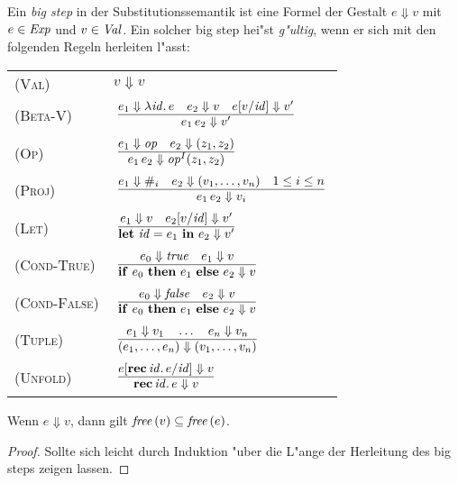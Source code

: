\documentclass[12pt,fleqn,a4paper]{article}
\newcommand{\RN}[1]{\mbox{\textsc{(#1)}}}
\begin{document}
\begin{definition}
Ein {\em big step} in der Substitutionssemantik ist eine Formel der Gestalt $e \Downarrow v$ mit $e\in{\text{\it Exp\/}}$
und $v \in {\text{\it Val\/}}$. Ein solcher big step hei"st {\em g"ultig}, wenn er sich mit den folgenden Regeln herleiten
l"asst: \\[5mm]
\begin{tabular}{ll}
  \RN{Val}        & $v \Downarrow v$ \\[3mm]
  \RN{Beta-V}     & $\regel{e_1 \Downarrow \abstr{\id}{e} \quad e_2 \Downarrow v \quad e[v/\id] \Downarrow v'}
                           {\app{e_1}{e_2} \Downarrow v'}$ \\[3mm]
  \RN{Op}         & $\regel{e_1 \Downarrow \op \quad e_2 \Downarrow (z_1,z_2)}
                           {\app{e_1}{e_2} \Downarrow \op^I(z_1,z_2)}$ \\[3mm]
  \RN{Proj}       & $\regel{e_1 \Downarrow \proj{i} \quad e_2 \Downarrow (v_1,\ldots,v_n) \quad 1 \le i \le n}
                           {\app{e_1}{e_2} \Downarrow v_i}$ \\[3mm]
  \RN{Let}        & $\regel{e_1 \Downarrow v \quad e_2[v/\id] \Downarrow v'}
                           {\bli{\id}{e_1}{e_2} \Downarrow v'}$ \\[3mm]
  \RN{Cond-True}  & $\regel{e_0 \Downarrow \true \quad e_1 \Downarrow v}
                           {\bifte{e_0}{e_1}{e_2} \Downarrow v}$ \\[3mm]
  \RN{Cond-False} & $\regel{e_0 \Downarrow \false \quad e_2 \Downarrow v}
                           {\bifte{e_0}{e_1}{e_2} \Downarrow v}$ \\[3mm]
  \RN{Tuple}      & $\regel{e_1 \Downarrow v_1 \quad \ldots \quad e_n \Downarrow v_n}
                           {(e_1,\ldots,e_n) \Downarrow (v_1,\ldots,v_n)}$ \\[3mm]
  \RN{Unfold}     & $\regel{e[\rec{\id}{e}/\id] \Downarrow v}
                           {\rec{\id}{e} \Downarrow v}$ \\[3mm]
\end{tabular}
\end{definition}

\begin{lemma} \label{lemma:WD_Substs}
  Wenn $e \Downarrow v$, dann gilt ${\text{\it free\/}}\,(v) \subseteq {\text{\it free\/}}\,(e)$.
\end{lemma}

\begin{proof}
  Sollte sich leicht durch Induktion "uber die L"ange der Herleitung des big steps zeigen lassen.
\end{proof}
\end{document}
